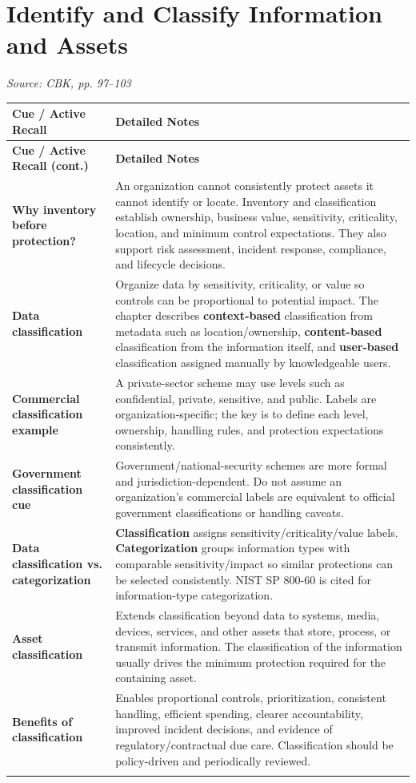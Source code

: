 \documentclass[10pt,letterpaper]{article}
\makeatletter
\newenvironment{cornell}
{\rowcolors{2}{white}{notebg}\begin{longtable}{@{}>{\raggedright\arraybackslash\columncolor{cuebg}\color{navy}\bfseries}p{0.285\textwidth}>{\raggedright\arraybackslash}p{0.65\textwidth}@{}}
\rowcolor{navy}\color{white}\textbf{Cue / Active Recall} & \color{white}\textbf{Detailed Notes}\\ \hline\endfirsthead
\rowcolor{navy}\color{white}\textbf{Cue / Active Recall (cont.)} & \color{white}\textbf{Detailed Notes}\\ \hline\endhead}{\end{longtable}}
\newcommand{\noterow}[2]{#1 & #2\\\arrayrulecolor{line}\hline}
\newcommand{\source}[1]{\par{\footnotesize\color{teal}\textit{Source: CBK, #1}}\par}
\makeatother
\begin{document}
\section{\color{navy}Identify and Classify Information and Assets}
\source{pp. 97--103}
\begin{cornell}
\noterow{Why inventory before protection?}{An organization cannot consistently protect assets it cannot identify or locate. Inventory and classification establish ownership, business value, sensitivity, criticality, location, and minimum control expectations. They also support risk assessment, incident response, compliance, and lifecycle decisions.}
\noterow{Data classification}{Organize data by sensitivity, criticality, or value so controls can be proportional to potential impact. The chapter describes \textbf{context-based} classification from metadata such as location/ownership, \textbf{content-based} classification from the information itself, and \textbf{user-based} classification assigned manually by knowledgeable users.}
\noterow{Commercial classification example}{A private-sector scheme may use levels such as confidential, private, sensitive, and public. Labels are organization-specific; the key is to define each level, ownership, handling rules, and protection expectations consistently.}
\noterow{Government classification cue}{Government/national-security schemes are more formal and jurisdiction-dependent. Do not assume an organization's commercial labels are equivalent to official government classifications or handling caveats.}
\noterow{Data classification vs. categorization}{\textbf{Classification} assigns sensitivity/criticality/value labels. \textbf{Categorization} groups information types with comparable sensitivity/impact so similar protections can be selected consistently. NIST SP 800-60 is cited for information-type categorization.}
\noterow{Asset classification}{Extends classification beyond data to systems, media, devices, services, and other assets that store, process, or transmit information. The classification of the information usually drives the minimum protection required for the containing asset.}
\noterow{Benefits of classification}{Enables proportional controls, prioritization, consistent handling, efficient spending, clearer accountability, improved incident decisions, and evidence of regulatory/contractual due care. Classification should be policy-driven and periodically reviewed.}
\end{cornell}
\end{document}
